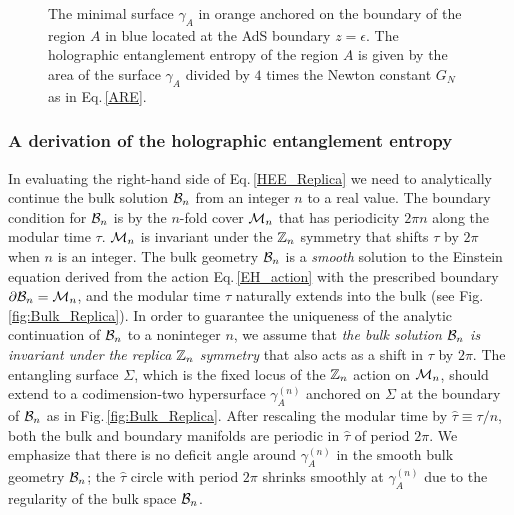 \begin{figure}[htbp]
\centering
	\caption{The minimal surface $\gamma_A$ in orange anchored on the boundary of the region $A$ in blue located at the AdS boundary $z=\epsilon$.
	The holographic entanglement entropy of the region $A$ is given by the area of the surface $\gamma_A$ divided by $4$ times the Newton constant $G_N$ as in Eq.\,\eqref{ARE}.
	}
	\label{fig:HEE}
\end{figure}


\subsubsection{A derivation of the holographic entanglement entropy}\label{ss:HEE_Derivation}
In evaluating the right-hand side of Eq.\,\eqref{HEE_Replica} we need to analytically continue the bulk solution ${\cal B}_n$ from an integer $n$ to a real value.
The boundary condition for ${\cal B}_n$ is by the $n$-fold cover ${\cal M}_n$ that has periodicity $2\pi n$ along the modular time $\tau$.
${\cal M}_n$ is invariant under the $\mathbb{Z}_n$ symmetry that shifts $\tau$ by $2\pi$ when $n$ is an integer.
The bulk geometry ${\cal B}_n$ is a \emph{smooth} solution to the Einstein equation derived from the action Eq.\,\eqref{EH_action} with the prescribed boundary $\partial{\cal B}_n = {\cal M}_n$, and 
the modular time $\tau$ naturally extends into the bulk (see Fig.\,\ref{fig:Bulk_Replica}).
In order to guarantee the uniqueness of the analytic continuation of ${\cal B}_n$ to a noninteger $n$, we assume that \emph{the bulk solution ${\cal B}_n$ is invariant under the replica $\mathbb{Z}_n$ symmetry} that also acts as a shift in $\tau$ by $2\pi$.
The entangling surface $\Sigma$, which is the fixed locus of the $\mathbb{Z}_n$ action on ${\cal M}_n$, should extend to a codimension-two hypersurface $\gamma_A^{(n)}$ anchored on $\Sigma$ at the boundary of ${\cal B}_n$ as in
Fig.\,\ref{fig:Bulk_Replica}.
After rescaling the modular time by $\hat \tau \equiv \tau/n$, both the bulk and boundary manifolds are periodic in $\hat \tau$ of period $2\pi$.
We emphasize that there is no deficit angle around $\gamma_A^{(n)}$ in the smooth bulk geometry ${\cal B}_n$; the $\hat\tau$ circle with period $2\pi$ shrinks smoothly at $\gamma_A^{(n)}$ due to the regularity of the bulk space ${\cal B}_n$.


